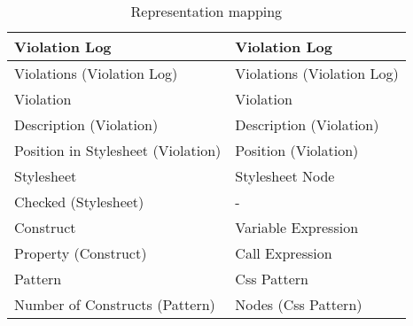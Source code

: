 \begin{table}[t]
\begin{center}
\begin{longtable}{ | p{20em} | p{20em} | }
Violation Log & Violation Log \\ \hline
Violations (Violation Log) & Violations (Violation Log) \\ \hline
Violation & Violation \\ \hline
Description (Violation) & Description (Violation) \\ \hline
Position in Stylesheet (Violation) & Position (Violation) \\ \hline

Stylesheet & Stylesheet Node \\ \hline
Checked (Stylesheet) & - \\ \hline
Construct & Variable Expression \\ \hline
Property (Construct) & Call Expression \\ \hline
Pattern & Css Pattern \\ \hline
Number of Constructs (Pattern) & Nodes (Css Pattern) \\ \hline
\end{longtable}
\end{center}
\caption{
	\label{tab:representation}
	Representation mapping}
\end{table}

